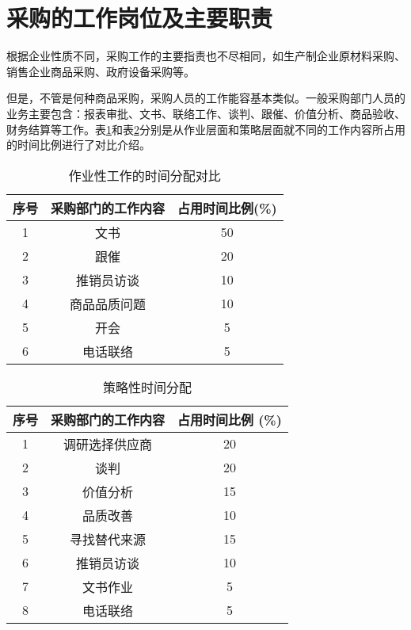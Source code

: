 \section {采购的工作岗位及主要职责}

    根据企业性质不同，采购工作的主要指责也不尽相同，如生产制企业原材料采购、销售企业商品采购、政府设备采购等。

    但是，不管是何种商品采购，采购人员的工作能容基本类似。一般采购部门人员的业务主要包含：报表审批、文书、联络工作、谈判、跟催、价值分析、商品验收、财务结算等工作。表\ref{tab:workingTimeAlloc}和表\ref{tab:strategyTimeAlloc}分别是从作业层面和策略层面就不同的工作内容所占用的时间比例进行了对比介绍。

    \begin{table}[bcht]
        \centering
        \begin{tabular}{c|c|c}
            \hline
            序号 & 采购部门的工作内容 & 占用时间比例(\%) \\ \hline
            1 & 文书 & 50 \\ \hline
            2 & 跟催 & 20 \\ \hline
            3 & 推销员访谈 & 10 \\ \hline
            4 & 商品品质问题 & 10 \\ \hline
            5 & 开会 & 5 \\ \hline
            6 & 电话联络 & 5 \\ \hline
        \end{tabular}
        \caption{作业性工作的时间分配对比} \label{tab:workingTimeAlloc}
    \end{table}

    \begin{table}[bcht]
        \centering
        \begin{tabular}{c|c|c}
            \hline
            序号 & 采购部门的工作内容 & 占用时间比例 (\%) \\ \hline
            1 & 调研选择供应商 & 20 \\ \hline
            2 & 谈判 & 20 \\ \hline
            3 & 价值分析 & 15 \\ \hline
            4 & 品质改善 & 10 \\ \hline
            5 & 寻找替代来源 & 15 \\ \hline
            6 & 推销员访谈 & 10 \\ \hline
            7 & 文书作业 & 5 \\ \hline
            8 & 电话联络 & 5 \\ \hline
        \end{tabular}
        \caption{策略性时间分配} \label{tab:strategyTimeAlloc}
    \end{table}


